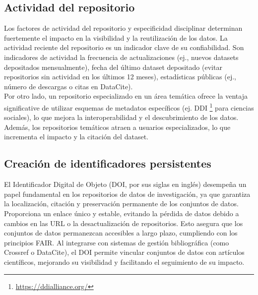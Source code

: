 \documentclass[runningheads]{llncs}
\begin{document}
\subsection*{Actividad del repositorio}
Los factores de actividad del repositorio y especificidad disciplinar  determinan fuertemente el impacto en la visibilidad y la reutilización de los datos. 
La actividad reciente del repositorio es un indicador clave de su confiabilidad. Son indicadores de actividad la frecuencia de actualizaciones (ej., nuevos datasets depositados mensualmente), fecha del último dataset depositado (evitar repositorios sin actividad en los últimos 12 meses), estadísticas públicas (ej., número de descargas o citas en DataCite).\\

Por otro lado, un repositorio especializado en un área temática ofrece la ventaja significative de utilizar esquemas de metadatos específicos (ej. DDI \footnote{\url{https://ddialliance.org/}} para ciencias sociales), lo que mejora la interoperabilidad y el descubrimiento de los datos. Además, los repositorios temáticos atraen a usuarios especializados, lo que incrementa el impacto y la citación del dataset.


\subsection*{Creación de identificadores persistentes} 

El Identificador Digital de Objeto (DOI, por sus siglas en inglés) desempeña un papel fundamental en los repositorios de datos de investigación, ya que garantiza la localización, citación y preservación permanente de los conjuntos de datos. Proporciona un enlace único y estable, evitando la pérdida de datos debido a cambios en las URL o la desactualización de repositorios. Esto asegura que los conjuntos de datos permanezcan accesibles a largo plazo, cumpliendo con los principios FAIR. Al integrarse con sistemas de gestión bibliográfica (como Crossref o DataCite), el DOI permite vincular conjuntos de datos con artículos científicos, mejorando su visibilidad y facilitando el seguimiento de su impacto.
\end{document}
